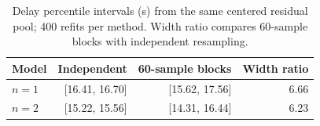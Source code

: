 \begin{table}[htbp]
\centering
\small
\caption{Delay percentile intervals (s) from the same centered residual pool; 400 refits per method. Width ratio compares 60-sample blocks with independent resampling.}
\label{tab:teaching-blocks}
\begin{tabular}{lrrr}
\toprule
Model & Independent & 60-sample blocks & Width ratio \\
\midrule
$n=1$ & [16.41, 16.70] & [15.62, 17.56] & 6.66 \\
$n=2$ & [15.22, 15.56] & [14.31, 16.44] & 6.23 \\
\bottomrule
\end{tabular}
\end{table}
